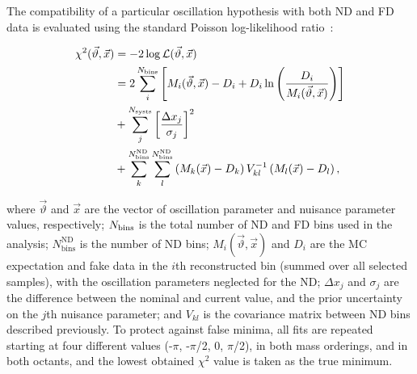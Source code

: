 The compatibility of a particular oscillation hypothesis with both ND and FD data is evaluated using the standard Poisson log-likelihood ratio~\cite{Tanabashi:2018oca}:
\begin{linenomath*}
  \begin{equation}
    \begin{aligned}
      \chi^2(\vec{\vartheta}, \vec{x}) &= -2\log\mathcal{L}(\vec{\vartheta}, \vec{x}) \\
      &= 2\sum_i^{N_{\rm bins}}\left[ M_i(\vec{\vartheta}, \vec{x})-D_i+D_i\ln\left({D_i\over M_i(\vec{\vartheta}, \vec{x})}\right) \right] \\
      &+ \sum_{j}^{N_{\mathrm{systs}}}\left[ \frac{\Delta x_{j}}{\sigma_{j}} \right]^{2} \\
      &+ \sum^{N^{\mathrm{ND}}_{\mathrm{bins}}}_{k}\sum^{N^{\mathrm{ND}}_{\mathrm{bins}}}_{l} \left(M_k(\vec{x})-D_k \right) V^{-1}_{kl}\left(M_l(\vec{x})-D_l \right),
    \end{aligned}
    \label{eq:chisq}
  \end{equation}
\end{linenomath*}
where $\vec{\vartheta}$ and $\vec{x}$ are the vector of oscillation parameter and nuisance parameter values, respectively; $N_{\rm bins}$ is the total number of ND and FD bins used in the analysis; $N^{\mathrm{ND}}_{\mathrm{bins}}$ is the number of ND bins; $M_i(\vec{\vartheta}, \vec{x})$ and $D_{i}$ are the MC expectation and fake data in the $i$th reconstructed bin (summed over all selected samples), with the oscillation parameters neglected for the ND; $\Delta x_{j}$ and $\sigma_{j}$ are the difference between the nominal and current value, and the prior uncertainty on the $j$th nuisance parameter; and $V_{kl}$ is the covariance matrix between ND bins described previously. To protect against false minima, all fits are repeated starting at four different \deltacp values (-$\pi$, -$\pi$/2, 0, $\pi$/2), in both mass orderings, and in both  octants, and the lowest obtained $\chi^{2}$ value is taken as the true minimum.

